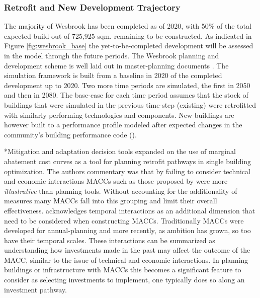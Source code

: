 \documentclass[twocolumn, a4paper,10pt]{article}
\makeatletter
\renewcommand\subsection{\@startsection{subsection}{1}{\z@}{\z@}{\z@}{\normalfont\normalsize\bfseries}}
\renewcommand\subsection{\@startsection{subsection}{1}{\z@}{\z@}{0.1pt}{\normalfont\normalsize\bfseries}}
\makeatother
\begin{document}
\subsubsection*{Retrofit and New Development Trajectory}
The majority of Wesbrook has been completed as of 2020, with 50\% of the total expected build-out of 725,925 sqm. remaining to be constructed. As indicated in Figure \ref{fig:wesbrook_base} the yet-to-be-completed development will be assessed in the model through the future periods. The Wesbrook planning and development scheme is well laid out in master-planning documents \citep{ubc_planning_ubc_2020_wb}. The simulation framework is built from a baseline in 2020 of the completed development up to 2020. Two more time periods are simulated, the first in 2050 and then in 2080. The base-case for each time period assumes that the stock of buildings that were simulated in the previous time-step (existing) were retrofitted with similarly performing technologies and components. New buildings are however built to a performance profile modeled after expected changes in the community's building performance code (\citep{noauthor_residential_2021}). 

\subsection*{Mitigation and adaptation decision tools}
\citet{rysanek_using_2013} expanded on the use of marginal abatement cost curves as a tool for planning retrofit pathways in single building optimization. The authors commentary was that by failing to consider technical and economic interactions MACCs such as those proposed by \citet{mckinsey__co_climate_2010} were more \textit{illustrative} than planning tools. Without accounting for the additionality of measures many MACCs fall into this grouping and limit their overall effectiveness. \citet{kesicki_marginal_2012} acknowledges temporal interactions as an additional dimension that need to be considered when constructing MACCs. Traditionally MACCs were developed for annual-planning and more recently, as ambition has grown, so too have their temporal scales. These interactions can be summarized as understanding how investments made in the past may affect the outcome of the MACC, similar to the issue of technical and economic interactions. In planning buildings or infrastructure with MACCs this becomes a significant feature to consider as selecting investments to implement, one typically does so along an investment pathway. 
\end{document}
